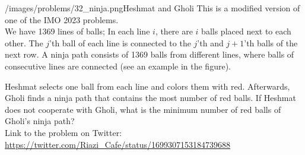 \begin{problem}{/images/problems/32_ninja.png}{Heshmat and Gholi}
This  is a modified version of one of the IMO 2023 problems.\\[0.2cm]

We have 1369 lines of balls; In each line $i$, there are $i$ balls placed next to each other. The $j$'th ball of each line is connected to the $j$'th and $j+1$'th balls of the next row. A ninja path consists of 1369 balls from different lines, where balls of consecutive lines are connected (see an example in the figure).

Heshmat selects one ball from each line and colors them with red. Afterwards, Gholi finds a ninja path that contains the most number of red balls. If Heshmat does not cooperate with Gholi, what is the minimum number of red balls of Gholi's ninja path?\\[0.2cm]

Link to the problem on Twitter:  \url{https://twitter.com/Riazi_Cafe/status/1699307153184739688}
\end{problem}
